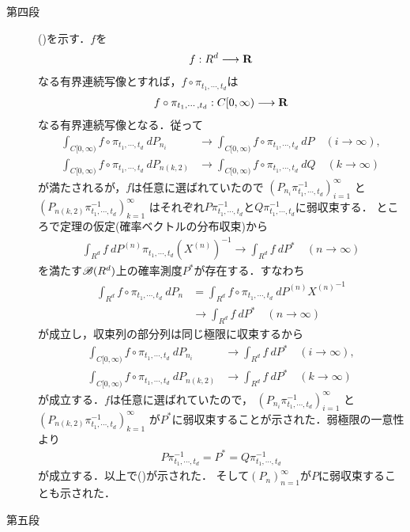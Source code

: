 \begin{sketch}
\begin{description}
			\item[第四段]
				()を示す．$f$を
				\begin{align}
					f:R^d \longrightarrow \mathbf{R}
				\end{align}
				なる有界連続写像とすれば，$f \circ \pi_{t_1,\cdots,t_d}$は
				\begin{align}
					f \circ \pi_{t_1,\cdots,t_d}:C[0,\infty) \longrightarrow \mathbf{R}
				\end{align}
				なる有界連続写像となる．従って
				\begin{align}
					\int_{C[0,\infty)} f \circ \pi_{t_1,\cdots,t_d}\ dP_{n_i}
						&\longrightarrow \int_{C[0,\infty)} f \circ \pi_{t_1,\cdots,t_d}\ dP
						\quad (i \longrightarrow \infty), \\
					\int_{C[0,\infty)} f \circ \pi_{t_1,\cdots,t_d}\ dP_{n(k,2)}
						&\longrightarrow \int_{C[0,\infty)} f \circ \pi_{t_1,\cdots,t_d}\ dQ
						\quad (k \longrightarrow \infty)
				\end{align}
				が満たされるが，$f$は任意に選ばれていたので
				$\left(P_{n_i}\pi_{t_1,\cdots,t_d}^{-1}\right)_{i=1}^\infty$
				と$\left(P_{n(k,2)}\pi_{t_1,\cdots,t_d}^{-1}\right)_{k=1}^\infty$
				はそれぞれ$P\pi_{t_1,\cdots,t_d}^{-1}$と$Q\pi_{t_1,\cdots,t_d}^{-1}$に弱収束する．
				ところで定理の仮定(確率ベクトルの分布収束)から
				\begin{align}
					\int_{R^d} f\ dP^{(n)}\pi_{t_1,\cdots,t_d} (X^{(n)})^{-1}
					\longrightarrow \int_{R^d} f\ dP^*
					\quad (n \longrightarrow \infty)
				\end{align}
				を満たす$\mathscr{B}(R^d)$上の確率測度$P^*$が存在する．すなわち
				\begin{align}
					\int_{R^d} f \circ \pi_{t_1,\cdots,t_d}\ dP_n
					&= \int_{R^d} f \circ \pi_{t_1,\cdots,t_d}\ dP^{(n)} {X^{(n)}}^{-1} \\
					&\longrightarrow \int_{R^d} f\ dP^* \quad (n \longrightarrow \infty)
				\end{align}
				が成立し，収束列の部分列は同じ極限に収束するから
				\begin{align}
					\int_{C[0,\infty)} f \circ \pi_{t_1,\cdots,t_d}\ dP_{n_i}
						&\longrightarrow \int_{R^d} f\ dP^*
						\quad (i \longrightarrow \infty), \\
					\int_{C[0,\infty)} f \circ \pi_{t_1,\cdots,t_d}\ dP_{n(k,2)}
						&\longrightarrow \int_{R^d} f\ dP^*
						\quad (k \longrightarrow \infty)
				\end{align}
				が成立する．$f$は任意に選ばれていたので，
				$\left(P_{n_i}\pi_{t_1,\cdots,t_d}^{-1}\right)_{i=1}^\infty$
				と$\left(P_{n(k,2)}\pi_{t_1,\cdots,t_d}^{-1}\right)_{k=1}^\infty$
				が$P^*$に弱収束することが示された．弱極限の一意性より
				\begin{align}
					P\pi_{t_1,\cdots,t_d}^{-1} = P^* = Q\pi_{t_1,\cdots,t_d}^{-1}
				\end{align}
				が成立する．以上で()が示された．
				そして$(P_n)_{n=1}^\infty$が$P$に弱収束することも示された．
			
			\item[第五段]
				
		\end{description}
	\end{sketch}